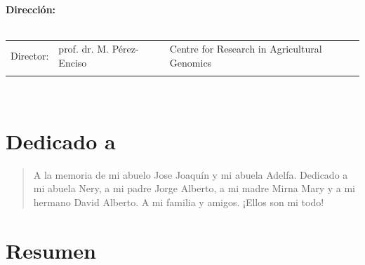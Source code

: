 \documentclass[11pt,spanish,a4paper,oneside,]{book} %
\begin{document}
\clearpage
\thispagestyle{empty}
\noindent\textbf{Dirección:}\\
\\
\noindent\begin{tabular}{@{}lll}

Director:
&  prof. dr. M. Pérez-Enciso & Centre for Research in Agricultural Genomics\\

\\
\end{tabular}\\



{
\hypersetup{linkcolor=black}
\setcounter{tocdepth}{1}
\tableofcontents
}
\mainmatter
\hypertarget{dedicado-a}{%
\chapter*{Dedicado a}\label{dedicado-a}}

\begin{quote}
A la memoria de mi abuelo Jose Joaquín y mi abuela Adelfa. Dedicado a mi abuela Nery, a mi padre Jorge Alberto, a mi madre Mirna Mary y a mi hermano David Alberto. A mi familia y amigos. ¡Ellos son mi todo!
\end{quote}

\clearpage\null\thispagestyle{empty}

\hypertarget{resumen}{%
\chapter{Resumen}\label{resumen}}
\end{document}
